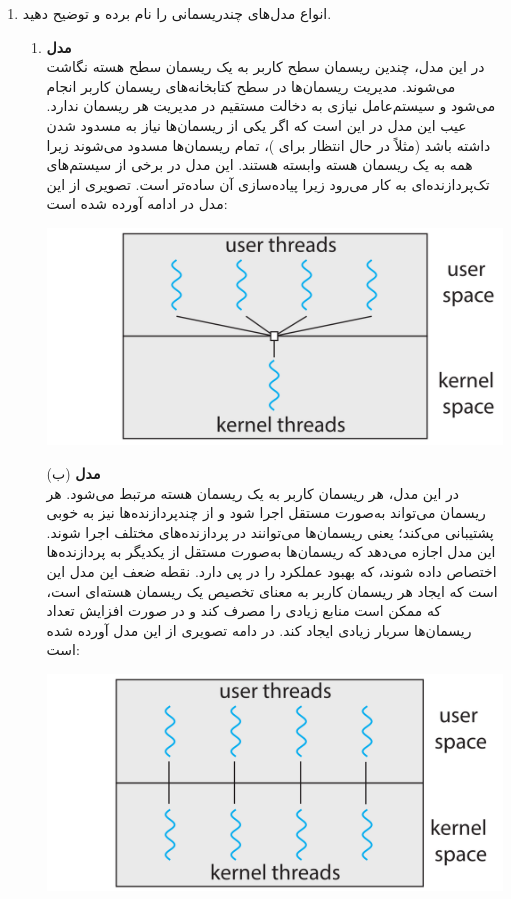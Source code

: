 \begin{enumerate}
	\item 
		انواع مدل‌های چندریسمانی را نام برده و توضیح دهید.
		
		\begin{qsolve}
			\begin{enumerate}
				\item 
				\textbf{مدل }\\
				در این مدل، چندین ریسمان سطح کاربر به یک ریسمان سطح هسته نگاشت می‌شوند. مدیریت ریسمان‌ها در سطح کتابخانه‌های ریسمان کاربر انجام می‌شود و سیستم‌عامل نیازی به دخالت مستقیم در مدیریت هر ریسمان ندارد. عیب این مدل در این است که اگر یکی از ریسمان‌ها نیاز به مسدود شدن داشته باشد (مثلاً در حال انتظار برای )، تمام ریسمان‌ها مسدود می‌شوند زیرا همه به یک ریسمان هسته وابسته هستند. این مدل در برخی از سیستم‌های تک‌پردازنده‌ای به کار می‌رود زیرا پیاده‌سازی آن ساده‌تر است. تصویری از این مدل در ادامه آورده شده است:
				
				
				\begin{center}
					\includegraphics*[width=0.6\linewidth]{pics/img1.png}
				\end{center}
			\end{enumerate}
		\end{qsolve}
		
		
		\begin{qsolve}
		\begin{enumerate}
			\item [(ب)]
			\textbf{مدل \lr{One-to-One}}\\
			در این مدل، هر ریسمان کاربر به یک ریسمان هسته مرتبط می‌شود.
			هر ریسمان می‌تواند به‌صورت مستقل اجرا شود و از چندپردازنده‌ها نیز به خوبی پشتیبانی می‌کند؛ یعنی ریسمان‌ها می‌توانند در پردازنده‌های مختلف اجرا شوند.
			این مدل اجازه می‌دهد که ریسمان‌ها به‌صورت مستقل از یکدیگر به پردازنده‌ها اختصاص داده شوند، که بهبود عملکرد را در پی دارد.
			نقطه ضعف این مدل این است که ایجاد هر ریسمان کاربر به معنای تخصیص یک ریسمان هسته‌ای است، که ممکن است منابع زیادی را مصرف کند و در صورت افزایش تعداد ریسمان‌ها سربار زیادی ایجاد کند. در دامه تصویری از این مدل آورده شده است:
			
			\begin{center}
				\includegraphics*[width=0.6\linewidth]{pics/img2.png}
				\captionof{figure}{مدل \lr{One-to-One}}
			\end{center}
			

\end{enumerate}
\end{qsolve}
\end{enumerate}
